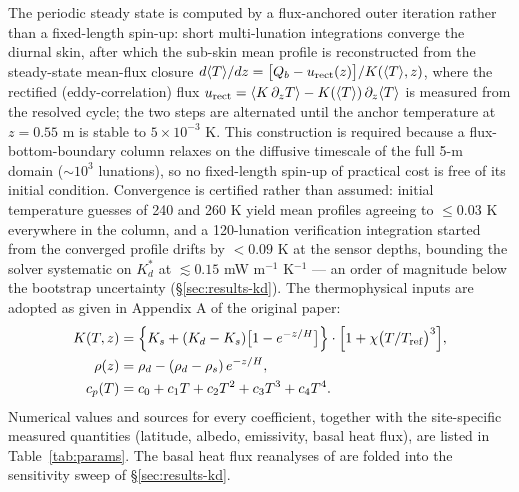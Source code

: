 \documentclass[11pt]{article}
\newcommand{\new}[1]{\textcolor{green!60!black}{#1}}
\newcommand{\new}[1]{\textcolor{green!60!black}{#1}}
\newcommand{\new}[1]{#1}
\begin{document}
\new{The periodic steady state is computed by a flux-anchored outer
iteration rather than a fixed-length spin-up: short multi-lunation
integrations converge the diurnal skin, after which the sub-skin
mean profile is reconstructed from the steady-state mean-flux closure
$d\langle T\rangle/dz=\bigl[Q_b-u_{\rm rect}(z)\bigr]/K(\langle
T\rangle,z)$, where the rectified (eddy-correlation) flux
$u_{\rm rect}=\langle K\,\partial_z T\rangle-K(\langle
T\rangle)\,\partial_z\langle T\rangle$ is measured from the resolved
cycle; the two steps are alternated until the anchor temperature at
$z=0.55$ m is stable to $5\times10^{-3}$ K. This construction is
required because a flux-bottom-boundary column relaxes on the
diffusive timescale of the full 5-m domain ($\sim$$10^3$ lunations), so
no fixed-length spin-up of practical cost is free of its initial
condition. Convergence is certified rather than assumed: initial
temperature guesses of 240 and 260 K yield mean profiles agreeing to
$\le 0.03$ K everywhere in the column, and a 120-lunation verification
integration started from the converged profile drifts by $<0.09$ K at
the sensor depths, bounding the solver systematic on $K_d^{*}$ at
$\lesssim 0.15$ mW m$^{-1}$ K$^{-1}$ --- an order of magnitude below
the bootstrap uncertainty (\S\ref{sec:results-kd}).} The
\citet{hayne2017} thermophysical inputs are adopted as given in Appendix A
of the original paper:
\begin{align}
K(T,z) &= \Bigl\{K_s + (K_d-K_s)\bigl[1-e^{-z/H}\bigr]\Bigr\}
         \cdot\Bigl[1 + \chi\bigl(T/T_\mathrm{ref}\bigr)^3\Bigr], \label{eq:K} \\
\rho(z) &= \rho_d - (\rho_d-\rho_s)\,e^{-z/H}, \label{eq:rho}\\
c_p(T)  &= c_0 + c_1 T + c_2 T^2 + c_3 T^3 + c_4 T^4. \label{eq:cp}
\end{align}
Numerical values and sources for every coefficient, together with the
site-specific measured quantities (latitude, albedo, emissivity, basal heat
flux), are listed in Table~\ref{tab:params}. The basal heat flux
reanalyses of \citet{saito2007,nagihara2018} are folded into the
sensitivity sweep of \S\ref{sec:results-kd}.
\end{document}
